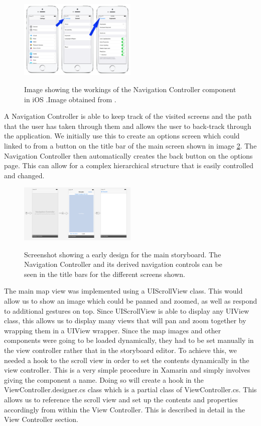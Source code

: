 \documentclass[main.tex]{subfiles}
\begin{document}
\begin{figure}[H]
\centering
\includegraphics[width=0.5\textwidth]{images-implementation/NavigationController.png}
\label{NavigationController}
\caption{Image showing the workings of the Navigation Controller component in iOS .Image obtained from \cite{iosnavigxtioncontroller}.}
\end{figure}

A Navigation Controller is able to keep track of the visited screens and the path that the user has taken through them and allows the user to back-track through the application. We initially use this to create an options screen which could linked to from a button on the title bar of the main screen shown in image \ref{initStoryboard}. The Navigation Controller then automatically creates the back button on the options page. This can allow for a complex hierarchical structure that is easily controlled and changed.

\begin{figure}[H]
\centering
\includegraphics[width=0.5\textwidth]{images-implementation/InitialStoryboard.png}
\label{initStoryboard}
\caption{Screenshot showing a early design for the main storyboard. The Navigation Controller and its derived navigation controls can be seen in the title bars for the different screens shown.}
\end{figure}

The main map view was implemented using a UIScrollView class. This would allow us to show an image which could be panned and zoomed, as well as respond to additional gestures on top. Since UIScrollView is able to display any UIView class, this allows us to display many views that will pan and zoom together by wrapping them in a UIView wrapper. Since the map images and other components were going to be loaded dynamically, they had to be set manually in the view controller rather that in the storyboard editor. To achieve this, we needed a hook to the scroll view in order to set the contents dynamically in the view controller. This is a very simple procedure in Xamarin and simply involves giving the component a name. Doing so will create a hook in the ViewController.designer.cs class which is a partial class of ViewController.cs. This allows us to reference the scroll view and set up the contents and properties accordingly from within the View Controller. This is described in detail in the View Controller section.
\end{document}
